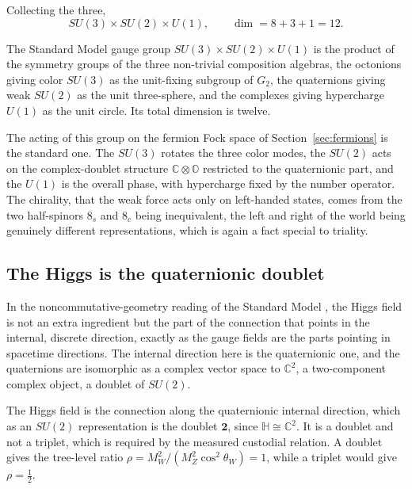 Collecting the three,
\begin{equation}
  SU(3) \times SU(2) \times U(1), \qquad \dim = 8 + 3 + 1 = 12 .
\end{equation}

\begin{result}
The Standard Model gauge group $SU(3) \times SU(2) \times U(1)$ is the product of the symmetry groups of the three
non-trivial composition algebras, the octonions giving color $SU(3)$ as the unit-fixing subgroup of $G_2$, the
quaternions giving weak $SU(2)$ as the unit three-sphere, and the complexes giving hypercharge $U(1)$ as the unit
circle. Its total dimension is twelve.
\end{result}

The acting of this group on the fermion Fock space of Section~\ref{sec:fermions} is the standard one. The $SU(3)$
rotates the three color modes, the $SU(2)$ acts on the complex-doublet structure $\mathbb{C} \otimes \mathbb{O}$
restricted to the quaternionic part, and the $U(1)$ is the overall phase, with hypercharge fixed by the number
operator. The chirality, that the weak force acts only on left-handed states, comes from the two half-spinors $8_s$ and
$8_c$ being inequivalent, the left and right of the world being genuinely different representations, which is again a
fact special to triality.

\subsection{The Higgs is the quaternionic doublet}

In the noncommutative-geometry reading of the Standard Model \cite{connes1996}, the Higgs field is not an extra
ingredient but the part of the connection that points in the internal, discrete direction, exactly as the gauge fields
are the parts pointing in spacetime directions. The internal direction here is the quaternionic one, and the
quaternions are isomorphic as a complex vector space to $\mathbb{C}^2$, a two-component complex object, a doublet of
$SU(2)$.

\begin{result}
The Higgs field is the connection along the quaternionic internal direction, which as an $SU(2)$ representation is the
doublet $\mathbf{2}$, since $\mathbb{H} \cong \mathbb{C}^2$. It is a doublet and not a triplet, which is required by
the measured custodial relation. A doublet gives the tree-level ratio $\rho = M_W^2 / (M_Z^2 \cos^2\theta_W) = 1$,
while a triplet would give $\rho = \tfrac12$.
\end{result}

